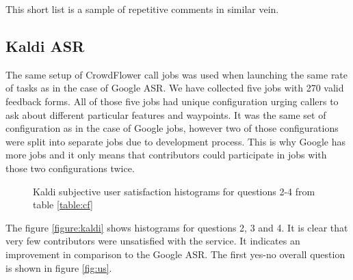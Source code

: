 \noindent This short list is a sample of repetitive comments in similar vein.

\subsection{Kaldi \acs{ASR}}

The same setup of CrowdFlower call jobs was used when launching the same rate of tasks as in the case of Google \ac{ASR}.
We have collected five jobs with 270 valid feedback forms.
All of those five jobs had unique configuration urging callers to ask about different particular features and waypoints.
It was the same set of configuration as in the case of Google jobs, however two of those configurations were split into separate jobs due to development process.
This is why Google has more jobs and it only means that contributors could participate in jobs with those two configurations twice.

\begin{figure}[ht]
\caption{Kaldi subjective user satisfaction histograms for questions 2-4 from table \ref{table:cf}}
\label{fig:kaldi}
\end{figure}


The figure \ref{figure:kaldi} shows histograms for questions 2, 3 and 4.
It is clear that very few contributors were unsatisfied with the service.
It indicates an improvement in comparison to the Google \ac{ASR}.
The first yes-no overall question is shown in figure \ref{fig:us}.

